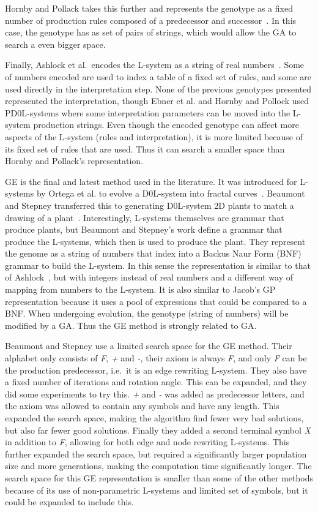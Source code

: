 Hornby and Pollack takes this further and represents the genotype as a fixed number of production rules composed of a predecessor and successor~\cite{2001Hornby}.
In this case, the genotype has as set of pairs of strings, which would allow the GA to search a even bigger space.

Finally, Ashlock et al.\ encodes the L-system as a string of real numbers~\cite{2006Ashlock}.
Some of numbers encoded are used to index a table of a fixed set of rules, and some are used directly in the interpretation step.
None of the previous genotypes presented represented the interpretation, though Ebner et al. and Hornby and Pollock used PD0L-systems where some interpretation parameters can be moved into the L-system production strings.
Even though the encoded genotype can affect more aspects of the L-system (rules and interpretation), it is more limited because of its fixed set of rules that are used.
Thus it can search a smaller space than Hornby and Pollack's representation.

GE is the final and latest method used in the literature.
It was introduced for L-systems by Ortega et al. to evolve a D0L-system into fractal curves~\cite{2003Ortega}.
Beaumont and Stepney transferred this to generating D0L-system 2D plants to match a drawing of a plant~\cite{2009Beaumont}.
Interestingly, L-systems themselves are grammar that produce plants, but Beaumont and Stepney's work define a grammar that produce the L-systems, which then is used to produce the plant.
They represent the genome as a string of numbers that index into a Backus Naur Form (BNF) grammar to build the L-system.
In this sense the representation is similar to that of Ashlock~\cite{2006Ashlock}, but with integers instead of real numbers and a different way of mapping from numbers to the L-system.
It is also similar to Jacob's GP representation because it uses a pool of expressions that could be compared to a BNF.
When undergoing evolution, the genotype (string of numbers) will be modified by a GA.
Thus the GE method is strongly related to GA.

Beaumont and Stepney use a limited search space for the GE method.
Their alphabet only consists of \textit{F}, \textit{+} and \textit{-}, their axiom is always \textit{F}, and only \textit{F} can be the production predecessor, i.e.\ it is an edge rewriting L-system.
They also have a fixed number of iterations and rotation angle.
This can be expanded, and they did some experiments to try this.
\textit{+} and \textit{-} was added as predecessor letters, and the axiom was allowed to contain any symbols and have any length.
This expanded the search space, making the algorithm find fewer very bad solutions, but also far fewer good solutions.
Finally they added a second terminal symbol \textit{X} in addition to \textit{F}, allowing for both edge and node rewriting L-systems.
This further expanded the search space, but required a significantly larger population size and more generations, making the computation time significantly longer.
The search space for this GE representation is smaller than some of the other methods because of its use of non-parametric L-systems and limited set of symbols, but it could be expanded to include this.

